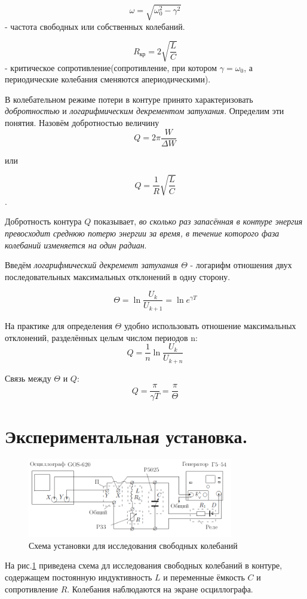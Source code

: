 \documentclass[a4paper, 12pt, twoside]{article}
\begin{document}
$$\omega = \sqrt{\omega_{0}^2-\gamma^2}$$ - частота свободных или собственных колебаний.

$$ R_{\text{кр}} = 2\sqrt{\dfrac{L}{C}}$$ - критическое сопротивление(сопротивление, при котором $\gamma = \omega_{0}$, а периодические колебания сменяются апериодическими).

В колебательном режиме потери в контуре принято характеризовать \textit{добротностью} и \textit{логарифмическим декрементом затухания}. Определим эти понятия. Назовём добротностью величину $$Q = 2\pi \dfrac{W}{\Delta W}$$

или

$$Q=\dfrac{1}{R}\sqrt {\dfrac{L}{C}}$$.

Добротность контура $Q$ показывает, \textit{во сколько раз запасённая в контуре энергия превосходит среднюю потерю энергии за время, в течение которого фаза колебаний изменяется на один радиан}.

Введём \textit{логарифмический декремент затухания $\Theta$} - логарифм отношения двух последовательных максимальных отклонений в одну сторону.

$$\Theta = \ln{\dfrac{U_k}{U_{k+1}}} = \ln{e^{\gamma T}}$$

На практике для определения $\Theta$ удобно использовать отношение максимальных отклонений, разделённых целым числом периодов n: $$Q=\dfrac{1}{n}\ln{\dfrac{U_k}{U_{k+n}}}$$

Связь между $\Theta$ и $Q$:
$$Q=\dfrac{\pi}{\gamma T} = \dfrac{\pi}{\Theta}$$


\section{Экспериментальная установка.}

\begin{figure}[H]
	\centering
	\includegraphics[width = 0.8\textwidth]{Schema}
	\caption{Схема установки для исследования свободных колебаний}
	\label{img:Schema}
\end{figure}

На рис.\ref{img:Schema} приведена схема дл исследования свободных колебаний в контуре, содержащем постоянную индуктивность $L$ и переменные ёмкость $C$ и сопротивление $R$. Колебания наблюдаются на экране осциллографа.
\end{document}
